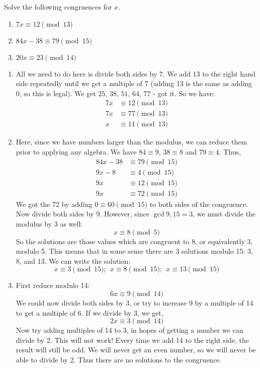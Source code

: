 \documentclass[12pt]{article}
\begin{document}
\begin{example}
	Solve the following congruences for $x$.
	\begin{enumerate}
		\item $7x \equiv 12 \pmod{13}$
		\item $84x - 38 \equiv 79 \pmod{15}$
		\item $20x \equiv 23 \pmod{14}$
	\end{enumerate}
	\begin{solution}
		\begin{enumerate}
		\item All we need to do here is divide both sides by 7.  We add 13 to the right hand side repeatedly until we get a multiple of 7 (adding 13 is the same as adding 0, so this is legal).  We get $25$, $38$, $51$, $64$, $77$ - got it.  So we have:
		\[\begin{aligned}
			7x & \equiv 12 \pmod{13} \\
			7x & \equiv 77 \pmod{13} \\
			x & \equiv 11 \pmod{13}
		\end{aligned} \]
		
		\item Here, since we have numbers larger than the modulus, we can reduce them prior to applying any algebra.  We have $84 \equiv 9$, $38 \equiv 8$ and $79 \equiv 4$.  Thus,
		\[\begin{aligned}
		84x - 38 & \equiv 79 \pmod{15} \\
		9x - 8 & \equiv 4 \pmod{15} \\
		9x & \equiv 12 \pmod{15} \\
		9x & \equiv 72 \pmod{15}
		\end{aligned}\]
		We got the 72 by adding $0 \equiv 60 \pmod{15}$ to both sides of the congruence.  Now divide both sides by 9.  However, since $\gcd{9, 15} = 3$, we must divide the modulus by 3 as well:
		\[x \equiv 8 \pmod 5\]
		So the solutions are those values which are congruent to 8, or equivalently 3, modulo 5.  This means that in some sense there are 3 solutions modulo 15: 3, 8, and 13.  We can write the solution:
		\[x \equiv 3 \pmod{15}; ~~ x \equiv 8 \pmod{15}; ~~x \equiv 13 \pmod{15}\]
		
		\item First reduce modulo 14:
		\[6x \equiv 9 \pmod{14}\]
		We could now divide both sides by 3, or try to increase 9 by a multiple of 14 to get a multiple of 6.  If we divide by 3, we get,
		\[2x \equiv 3 \pmod{14}\]
		Now try adding multiples of 14 to 3, in hopes of getting a number we can divide by 2.  This will not work!  Every time we add 14 to the right side, the result will still be odd.  We will never get an even number, so we will never be able to divide by 2.  Thus there are no solutions to the congruence.
		\end{enumerate}
	\end{solution}
\end{example}
\end{document}
